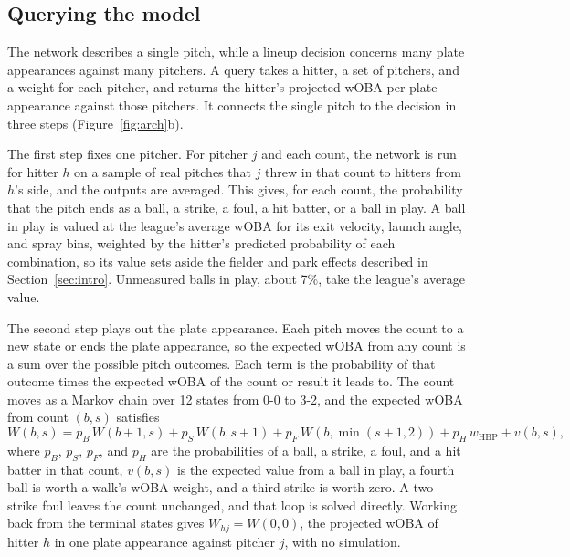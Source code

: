 \documentclass[11pt,letterpaper]{article}
\let\oldsubsection\subsection
\renewcommand\subsection{\FloatBarrier\oldsubsection}
\begin{document}
\subsection{Querying the model}
\label{sec:query}

The network describes a single pitch, while a lineup decision concerns many plate appearances against many pitchers. A query takes a hitter, a set of pitchers, and a weight for each pitcher, and returns the hitter's projected wOBA per plate appearance against those pitchers. It connects the single pitch to the decision in three steps (Figure~\ref{fig:arch}b).

The first step fixes one pitcher. For pitcher $j$ and each count, the network is run for hitter $h$ on a sample of real pitches that $j$ threw in that count to hitters from $h$'s side, and the outputs are averaged. This gives, for each count, the probability that the pitch ends as a ball, a strike, a foul, a hit batter, or a ball in play. A ball in play is valued at the league's average wOBA for its exit velocity, launch angle, and spray bins, weighted by the hitter's predicted probability of each combination, so its value sets aside the fielder and park effects described in Section~\ref{sec:intro}. Unmeasured balls in play, about 7\%, take the league's average value.

The second step plays out the plate appearance. Each pitch moves the count to a new state or ends the plate appearance, so the expected wOBA from any count is a sum over the possible pitch outcomes. Each term is the probability of that outcome times the expected wOBA of the count or result it leads to. The count moves as a Markov chain over 12 states from 0-0 to 3-2, and the expected wOBA from count $(b,s)$ satisfies
\begin{equation}
W(b,s) = p_B\, W(b+1,s) + p_S\, W(b,s+1) + p_F\, W(b,\min(s+1,2)) + p_H\, w_{\text{HBP}} + v(b,s),
\label{eq:chain}
\end{equation}
where $p_B$, $p_S$, $p_F$, and $p_H$ are the probabilities of a ball, a strike, a foul, and a hit batter in that count, $v(b,s)$ is the expected value from a ball in play, a fourth ball is worth a walk's wOBA weight, and a third strike is worth zero. A two-strike foul leaves the count unchanged, and that loop is solved directly. Working back from the terminal states gives $W_{hj} = W(0,0)$, the projected wOBA of hitter $h$ in one plate appearance against pitcher $j$, with no simulation.
\end{document}
